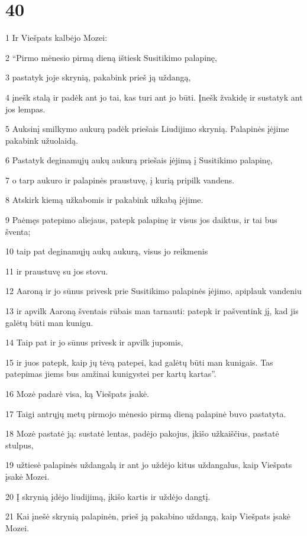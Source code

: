 \chapter{40}


\par 1 Ir Viešpats kalbėjo Mozei: 
\par 2 “Pirmo mėnesio pirmą dieną ištiesk Susitikimo palapinę, 
\par 3 pastatyk joje skrynią, pakabink prieš ją uždangą, 
\par 4 įnešk stalą ir padėk ant jo tai, kas turi ant jo būti. Įnešk žvakidę ir sustatyk ant jos lempas. 
\par 5 Auksinį smilkymo aukurą padėk priešais Liudijimo skrynią. Palapinės įėjime pakabink užuolaidą. 
\par 6 Pastatyk deginamųjų aukų aukurą priešais įėjimą į Susitikimo palapinę, 
\par 7 o tarp aukuro ir palapinės­ praustuvę, į kurią pripilk vandens. 
\par 8 Atskirk kiemą užkabomis ir pakabink užkabą įėjime. 
\par 9 Paėmęs patepimo aliejaus, patepk palapinę ir visus jos daiktus, ir tai bus šventa; 
\par 10 taip pat deginamųjų aukų aukurą, visus jo reikmenis 
\par 11 ir praustuvę su jos stovu. 
\par 12 Aaroną ir jo sūnus privesk prie Susitikimo palapinės įėjimo, apiplauk vandeniu 
\par 13 ir apvilk Aaroną šventais rūbais man tarnauti: patepk ir pašventink jį, kad jis galėtų būti man kunigu. 
\par 14 Taip pat ir jo sūnus privesk ir apvilk jupomis, 
\par 15 ir juos patepk, kaip jų tėvą patepei, kad galėtų būti man kunigais. Tas patepimas jiems bus amžinai kunigystei per kartų kartas”. 
\par 16 Mozė padarė visa, ką Viešpats įsakė. 
\par 17 Taigi antrųjų metų pirmojo mėnesio pirmą dieną palapinė buvo pastatyta. 
\par 18 Mozė pastatė ją: sustatė lentas, padėjo pakojus, įkišo užkaiščius, pastatė stulpus, 
\par 19 užtiesė palapinės uždangalą ir ant jo uždėjo kitus uždangalus, kaip Viešpats įsakė Mozei. 
\par 20 Į skrynią įdėjo liudijimą, įkišo kartis ir uždėjo dangtį. 
\par 21 Kai įnešė skrynią palapinėn, prieš ją pakabino uždangą, kaip Viešpats įsakė Mozei. 
